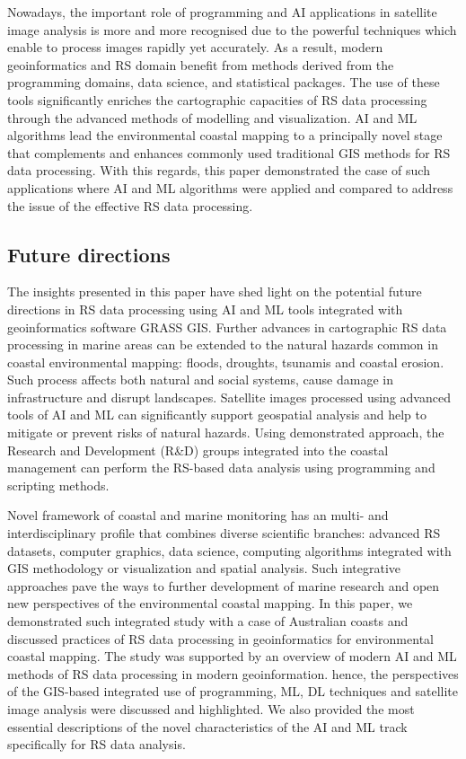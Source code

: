\documentclass[jmse,article,submit,pdftex,moreauthors]{Definitions/mdpi}
\begin{document}
Nowadays, the important role of programming and AI applications in satellite image analysis is more and more recognised due to the powerful techniques which enable to process images rapidly yet accurately. As a result, modern geoinformatics and RS domain benefit from methods derived from the programming domains, data science, and statistical packages. The use of these tools significantly enriches the cartographic capacities of RS data processing through the advanced methods of modelling and visualization. AI and ML algorithms lead the environmental coastal mapping to a principally novel stage that complements and enhances commonly used traditional GIS methods for RS data processing. With this regards, this paper demonstrated the case of such applications where AI and ML algorithms were applied and compared to address the issue of the effective RS data processing. 

\subsection{Future directions}
The insights presented in this paper have shed light on the potential future directions in RS data processing using AI and ML tools integrated with geoinformatics software GRASS GIS. Further advances in cartographic RS data processing in marine areas can be extended to the natural hazards common in coastal environmental mapping: floods, droughts, tsunamis and coastal erosion. Such process affects both natural and social systems, cause damage in infrastructure and disrupt landscapes. Satellite images processed using advanced tools of AI and ML can significantly support geospatial analysis and help to mitigate or prevent risks of natural hazards. Using demonstrated approach, the Research and Development (R\&D) groups integrated into the coastal management can perform the RS-based data analysis using programming and scripting methods.

Novel framework of coastal and marine monitoring has an multi- and interdisciplinary profile that combines diverse scientific branches: advanced RS datasets, computer graphics, data science, computing algorithms integrated with GIS methodology or visualization and spatial analysis. Such integrative approaches pave the ways to further development of marine research and open new perspectives of the environmental coastal mapping. In this paper, we demonstrated such integrated study with a case of Australian coasts and discussed practices of RS data processing in geoinformatics for environmental coastal mapping. The study was supported by an overview of modern AI and ML methods of RS data processing in modern geoinformation. hence, the perspectives of the GIS-based integrated use of programming, ML, DL techniques and satellite image analysis were discussed and highlighted. We also provided the most essential descriptions of the novel characteristics of the AI and ML track specifically for RS data analysis. 
\end{document}
